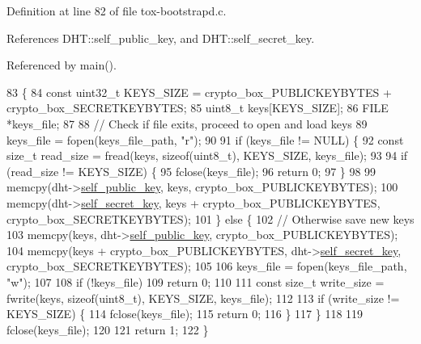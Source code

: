 Definition at line 82 of file tox-\/bootstrapd.\+c.



References D\+H\+T\+::self\+\_\+public\+\_\+key, and D\+H\+T\+::self\+\_\+secret\+\_\+key.



Referenced by main().


\begin{DoxyCode}
83 \{
84     \textcolor{keyword}{const} uint32\_t KEYS\_SIZE = crypto\_box\_PUBLICKEYBYTES + crypto\_box\_SECRETKEYBYTES;
85     uint8\_t keys[KEYS\_SIZE];
86     FILE *keys\_file;
87 
88     \textcolor{comment}{// Check if file exits, proceed to open and load keys}
89     keys\_file = fopen(keys\_file\_path, \textcolor{stringliteral}{"r"});
90 
91     \textcolor{keywordflow}{if} (keys\_file != NULL) \{
92         \textcolor{keyword}{const} \textcolor{keywordtype}{size\_t} read\_size = fread(keys, \textcolor{keyword}{sizeof}(uint8\_t), KEYS\_SIZE, keys\_file);
93 
94         \textcolor{keywordflow}{if} (read\_size != KEYS\_SIZE) \{
95             fclose(keys\_file);
96             \textcolor{keywordflow}{return} 0;
97         \}
98 
99         memcpy(dht->\hyperlink{struct_d_h_t_ae726df8bdc26380e5a6c3187a00d6881}{self\_public\_key}, keys, crypto\_box\_PUBLICKEYBYTES);
100         memcpy(dht->\hyperlink{struct_d_h_t_aa05050f86513ff53fe9da81f73c72267}{self\_secret\_key}, keys + crypto\_box\_PUBLICKEYBYTES, 
      crypto\_box\_SECRETKEYBYTES);
101     \} \textcolor{keywordflow}{else} \{
102         \textcolor{comment}{// Otherwise save new keys}
103         memcpy(keys, dht->\hyperlink{struct_d_h_t_ae726df8bdc26380e5a6c3187a00d6881}{self\_public\_key}, crypto\_box\_PUBLICKEYBYTES);
104         memcpy(keys + crypto\_box\_PUBLICKEYBYTES, dht->\hyperlink{struct_d_h_t_aa05050f86513ff53fe9da81f73c72267}{self\_secret\_key}, 
      crypto\_box\_SECRETKEYBYTES);
105 
106         keys\_file = fopen(keys\_file\_path, \textcolor{stringliteral}{"w"});
107 
108         \textcolor{keywordflow}{if} (!keys\_file)
109             \textcolor{keywordflow}{return} 0;
110 
111         \textcolor{keyword}{const} \textcolor{keywordtype}{size\_t} write\_size = fwrite(keys, \textcolor{keyword}{sizeof}(uint8\_t), KEYS\_SIZE, keys\_file);
112 
113         \textcolor{keywordflow}{if} (write\_size != KEYS\_SIZE) \{
114             fclose(keys\_file);
115             \textcolor{keywordflow}{return} 0;
116         \}
117     \}
118 
119     fclose(keys\_file);
120 
121     \textcolor{keywordflow}{return} 1;
122 \}
\end{DoxyCode}


